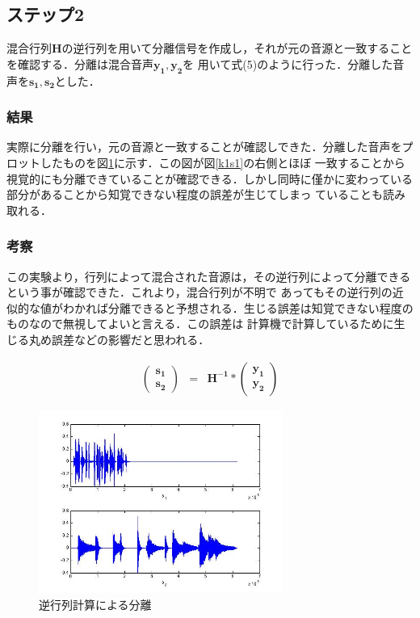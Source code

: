 \documentclass[a4j]{jarticle}
\begin{document}
\subsection{ステップ2}
混合行列$\bm{H}$の逆行列を用いて分離信号を作成し，それが元の音源と一致することを確認する．分離は混合音声$\bm{y_1}, \bm{y_2}$を
用いて式(5)のように行った．分離した音声を$\bm{s_1}, \bm{s_2}$とした．
\subsubsection{結果}
実際に分離を行い，元の音源と一致することが確認しできた．分離した音声をプロットしたものを図\ref{k1s2}に示す．この図が図\ref{k1s1}の右側とほぼ
一致することから視覚的にも分離できていることが確認できる．しかし同時に僅かに変わっている部分があることから知覚できない程度の誤差が生じてしまっ
ていることも読み取れる．
\subsubsection{考察}
この実験より，行列によって混合された音源は，その逆行列によって分離できるという事が確認できた．これより，混合行列が不明で
あってもその逆行列の近似的な値がわかれば分離できると予想される．生じる誤差は知覚できない程度のものなので無視してよいと言える．この誤差は
計算機で計算しているために生じる丸め誤差などの影響だと思われる．

\begin{eqnarray}
 \left(
\begin{array}{c}
 \bm{s_1}\\
\bm{s_2}
\end{array}
\right)
&=& \bm{H^{-1}} * 
\left(
\begin{array}{c}
 \bm{y_1}\\
 \bm{y_2}
\end{array}
\right)
\end{eqnarray}

\begin{figure}[htb]
 \begin{center}
  \includegraphics[width=8cm, clip, bb=0 0 560 460]{pic/k1s2.jpg}
  \caption{逆行列計算による分離}
  \label{k1s2}
 \end{center}
\end{figure}
\end{document}
